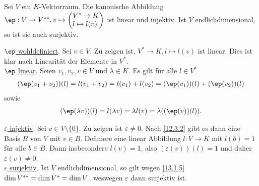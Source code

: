 \documentclass[../../main.tex]{subfiles}
\begin{document}
\begin{pro}\label{13.1.14}
Sei $V$ ein $K$-Vektorraum. Die kanonische Abbildung $\ep : V\to \ddual V, v\mapsto\begin{pmatrix*}[l]V^*\to K\\ l\mapsto l(v)\end{pmatrix*}$ ist linear und injektiv. Ist $V$ endlichdimensional, so ist sie auch surjektiv.
\end{pro}
\begin{cproof}
\underline{$\ep$ wohldefiniert}. Sei $v\in V$. Zu zeigen ist, $V^*\to K, l\mapsto l(v)$ ist linear. Dies ist klar nach Linearität der Elemente in $V^*$.\\
		
\noindent\underline{$\ep$ linear}. Seien $v_1,v_2,v\in V$ und $\lambda\in K$. Es gilt für alle $l\in V^*$
\begin{align*}
(\ep(v_1+v_2))(l)=l(v_1+v_2)=l(v_1)+l(v_2)=(\ep(v_1))(l)+(\ep(v_2))(l)
\end{align*}
sowie
\begin{align*}
(\ep(\lambda v))(l)=l(\lambda v)=\lambda l(v)=\lambda((\ep(v))(l)).
\end{align*}
		
\noindent\underline{$\varepsilon$ injektiv}. Sei $v\in V\setminus\{0\}$. Zu zeigen ist $\varepsilon\neq 0$. Nach \ref{12.3.2} gibt es dann eine Basis $B$ von $V$ mit $v\in B$. Definiere eine linear Abbildung $l: V\to K$ mit $l(b)=1$ für alle $b\in B$. Dann insbesondere $l(v)=1$, also $(\varepsilon(v))(l)=1$ und daher $\varepsilon(v)\neq 0$.\\
		
\noindent\underline{$\varepsilon$ surjektiv}. Ist $V$ endlichdimensional, so gilt wegen \eqref{13.1.5} $\dim V^{**}=\dim V^*=\dim V$, weswegen $\varepsilon$ dann surjektiv ist.
\end{cproof}
\end{document}
